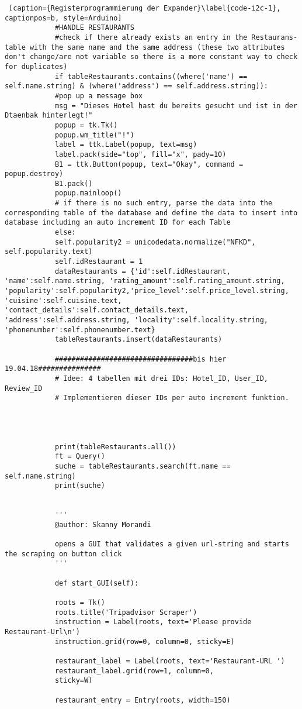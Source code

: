 \documentclass[a4paper,oneside,12pt]{report}
\begin{document}
\begin{lstlisting} [caption={Registerprogrammierung der Expander}\label{code-i2c-1}, captionpos=b, style=Arduino]
			#HANDLE RESTAURANTS
			#check if there already exists an entry in the Restaurans-table with the same name and the same address (these two attributes don't change/are not variable so there is a more constant way to check for duplicates)
			if tableRestaurants.contains((where('name') == self.name.string) & (where('address') == self.address.string)): 
			#pop up a message box
			msg = "Dieses Hotel hast du bereits gesucht und ist in der Dtaenbak hinterlegt!"
			popup = tk.Tk()
			popup.wm_title("!")
			label = ttk.Label(popup, text=msg)
			label.pack(side="top", fill="x", pady=10)
			B1 = ttk.Button(popup, text="Okay", command = popup.destroy)
			B1.pack()
			popup.mainloop()
			# if there is no such entry, parse the data into the corresponding table of the database and define the data to insert into database including an auto increment ID for each Table       
			else:
			self.popularity2 = unicodedata.normalize("NFKD", self.popularity.text)
			self.idRestaurant = 1  
			dataRestaurants = {'id':self.idRestaurant, 'name':self.name.string, 'rating_amount':self.rating_amount.string, 'popularity':self.popularity2,'price_level':self.price_level.string, 'cuisine':self.cuisine.text, 'contact_details':self.contact_details.text, 'address':self.address.string, 'locality':self.locality.string, 'phonenumber':self.phonenumber.text}
			tableRestaurants.insert(dataRestaurants) 
			
			#################################bis hier 19.04.18###############
			# Idee: 4 tabellen mit drei IDs: Hotel_ID, User_ID, Review_ID
			# Implementieren dieser IDs per auto increment funktion.
			
			
			
			
			print(tableRestaurants.all())
			ft = Query()
			suche = tableRestaurants.search(ft.name == self.name.string)
			print(suche)         
			
			
			'''
			@author: Skanny Morandi
			
			opens a GUI that validates a given url-string and starts the scraping on button click
			'''
			
			def start_GUI(self):
			
			roots = Tk()
			roots.title('Tripadvisor Scraper')
			instruction = Label(roots, text='Please provide Restaurant-Url\n')
			instruction.grid(row=0, column=0, sticky=E)
			
			restaurant_label = Label(roots, text='Restaurant-URL ')
			restaurant_label.grid(row=1, column=0,
			sticky=W)
			
			restaurant_entry = Entry(roots, width=150)
			

\end{lstlisting}
\end{document}
